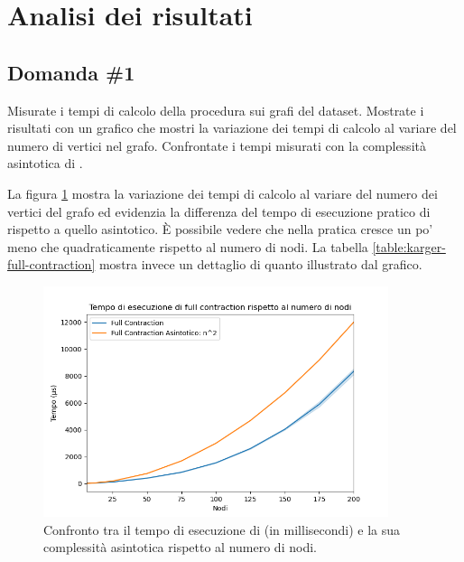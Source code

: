 \section{Analisi dei risultati}
\label{cap:performance-analysis}

\subsection{Domanda \#1}
\label{sec:question-1}

\begin{displayquote}
Misurate i tempi di calcolo della procedura
 sui grafi del dataset. Mostrate i
risultati con un grafico che mostri la variazione dei tempi di calcolo
al variare del numero di vertici nel grafo. Confrontate i tempi
misurati con la complessità asintotica di
.
\end{displayquote}

\noindent La figura \ref{fig:karger-full-contraction-chart} mostra la
variazione dei tempi di calcolo al variare del numero dei vertici del
grafo ed evidenzia la differenza del tempo di esecuzione pratico di
 rispetto a quello asintotico. È possibile vedere che nella pratica  cresce un po' meno che quadraticamente rispetto al numero di nodi. La tabella \ref{table:karger-full-contraction} mostra invece
un dettaglio di quanto illustrato dal grafico.

\begin{figure}[ht]
    \centering

    \includegraphics[width=0.9\textwidth]{./images/Tempo_di_esecuzione_di_full_contraction_rispetto_al_numero_di_nodi.png}

    \caption{Confronto tra il tempo di esecuzione di  (in millisecondi) e la sua complessità asintotica rispetto al numero di nodi.}
    \label{fig:karger-full-contraction-chart}
\end{figure}

